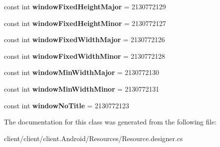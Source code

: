 \begin{DoxyCompactItemize}
\item 
\hypertarget{classClient_1_1Droid_1_1Resource_1_1Attribute_a25f13db37988cde0d91383c9abdc9ffe}{}const int {\bfseries window\+Fixed\+Height\+Major} = 2130772129\label{classClient_1_1Droid_1_1Resource_1_1Attribute_a25f13db37988cde0d91383c9abdc9ffe}

\item 
\hypertarget{classClient_1_1Droid_1_1Resource_1_1Attribute_a71e684cde396896aaa96617e69602dd4}{}const int {\bfseries window\+Fixed\+Height\+Minor} = 2130772127\label{classClient_1_1Droid_1_1Resource_1_1Attribute_a71e684cde396896aaa96617e69602dd4}

\item 
\hypertarget{classClient_1_1Droid_1_1Resource_1_1Attribute_a886c624701fe37db1288572e08c2f092}{}const int {\bfseries window\+Fixed\+Width\+Major} = 2130772126\label{classClient_1_1Droid_1_1Resource_1_1Attribute_a886c624701fe37db1288572e08c2f092}

\item 
\hypertarget{classClient_1_1Droid_1_1Resource_1_1Attribute_a9a5e2bd57ee9d3531f43c7cfa0536b6c}{}const int {\bfseries window\+Fixed\+Width\+Minor} = 2130772128\label{classClient_1_1Droid_1_1Resource_1_1Attribute_a9a5e2bd57ee9d3531f43c7cfa0536b6c}

\item 
\hypertarget{classClient_1_1Droid_1_1Resource_1_1Attribute_ab7bd24faa5d5ec0250e7b0a9be97e554}{}const int {\bfseries window\+Min\+Width\+Major} = 2130772130\label{classClient_1_1Droid_1_1Resource_1_1Attribute_ab7bd24faa5d5ec0250e7b0a9be97e554}

\item 
\hypertarget{classClient_1_1Droid_1_1Resource_1_1Attribute_a78e8cdbcbf9d03499aa9e7e72c2b25a2}{}const int {\bfseries window\+Min\+Width\+Minor} = 2130772131\label{classClient_1_1Droid_1_1Resource_1_1Attribute_a78e8cdbcbf9d03499aa9e7e72c2b25a2}

\item 
\hypertarget{classClient_1_1Droid_1_1Resource_1_1Attribute_aa5281869e33b0cc198a82a4abeaaa6e1}{}const int {\bfseries window\+No\+Title} = 2130772123\label{classClient_1_1Droid_1_1Resource_1_1Attribute_aa5281869e33b0cc198a82a4abeaaa6e1}

\end{DoxyCompactItemize}


The documentation for this class was generated from the following file\+:\begin{DoxyCompactItemize}
\item 
client/client/client.\+Android/\+Resources/Resource.\+designer.\+cs\end{DoxyCompactItemize}
